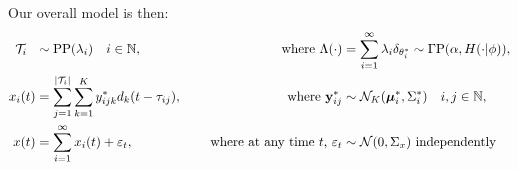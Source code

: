 
Our overall model is then:
\begin{subequations}
\begin{align}
  \mc{T}_i\ \  &\sim \text{PP}(\lambda_i) \quad i \in \NN, \quad &\text{ where } \Lambda(\cdot)&=\sum_{i=1}^{\infty} \lambda_i \delta_{\theta^*_i} \sim \Gamma \text{P}(\alpha, H(\cdot| {\phi})), \\ %
\vspace{-.8in}
  x_i(t) &= \sum_{j = 1}^{|\mc{T}_i|}  \sum_{k = 1}^{K} y^*_{ijk} d_k(t - \tau_{ij}), \quad &\text{ where }\by^*_{ij}  &\sim \mc{N}_K(\mb{\mu}^*_i, \Sigma^*_i) \quad i,j \in \NN, \\
  x(t)   &= \sum_{i=1}^{\infty} x_i(t) + \eps_t, \quad &\text{ where at any time $t$, } \eps_t &\sim \mc{N}(0,\Sigma_x) \text{ independently}
\end{align}
\end{subequations}

